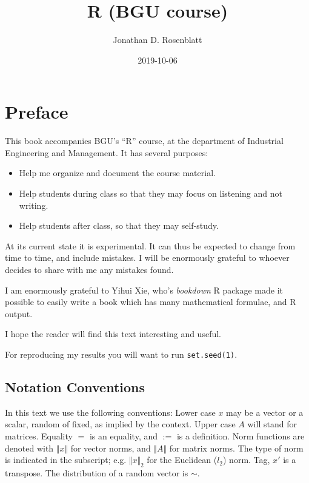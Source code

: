 \documentclass[]{book}
\title{R (BGU course)}
\author{Jonathan D. Rosenblatt}
\date{2019-10-06}
\providecommand{\tightlist}{%
  \setlength{\itemsep}{0pt}\setlength{\parskip}{0pt}}
\theoremstyle{definition}
\theoremstyle{definition}
\theoremstyle{definition}
\theoremstyle{remark}
\begin{document}
\maketitle

{
\setcounter{tocdepth}{1}
\tableofcontents
}
\hypertarget{preface}{%
\chapter{Preface}\label{preface}}

This book accompanies BGU's ``R'' course, at the department of Industrial Engineering and Management.
It has several purposes:

\begin{itemize}
\tightlist
\item
  Help me organize and document the course material.
\item
  Help students during class so that they may focus on listening and not writing.
\item
  Help students after class, so that they may self-study.
\end{itemize}

At its current state it is experimental.
It can thus be expected to change from time to time, and include mistakes.
I will be enormously grateful to whoever decides to share with me any mistakes found.

I am enormously grateful to Yihui Xie, who's \emph{bookdown} R package made it possible to easily write a book which has many mathematical formulae, and R output.

I hope the reader will find this text interesting and useful.

For reproducing my results you will want to run \texttt{set.seed(1)}.

\hypertarget{notation-conventions}{%
\section{Notation Conventions}\label{notation-conventions}}

In this text we use the following conventions:
Lower case \(x\) may be a vector or a scalar, random of fixed, as implied by the context.
Upper case \(A\) will stand for matrices.
Equality \(=\) is an equality, and \(:=\) is a definition.
Norm functions are denoted with \(\Vert x \Vert\) for vector norms, and \(\Vert A \Vert\) for matrix norms.
The type of norm is indicated in the subscript; e.g. \(\Vert x \Vert_2\) for the Euclidean (\(l_2\)) norm.
Tag, \(x'\) is a transpose.
The distribution of a random vector is \(\sim\).
\end{document}
